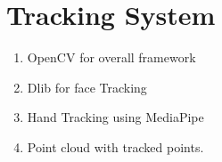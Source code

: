 \section{Tracking System}
\begin{enumerate}
	\item OpenCV for overall framework
	\item Dlib for face Tracking 
	\item Hand Tracking using MediaPipe
	\item Point cloud with tracked points.
\end{enumerate}